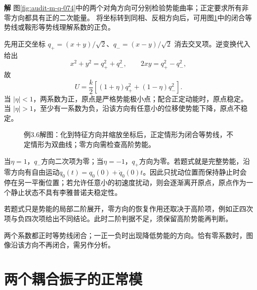 \documentclass[11pt,openany,fontset=fandol]{ctexbook}
\theoremstyle{plain}\newtheorem{theorem}{定理}[chapter]\newtheorem{proposition}[theorem]{命题}
\theoremstyle{definition}\newtheorem{definition}{定义}[chapter]\newtheorem{example}{例}[chapter]
\theoremstyle{remark}\newtheorem*{remark}{说明}
\newcommand{\SolutionStart}{\par\nobreak\medskip\nobreak\noindent\textbf{解}\quad\ignorespaces}
\newenvironment{solution}{\SolutionStart}{\par\medskip}
\begin{document}
\begin{solution}
图\ref{fig:audit-m-q-074}中的两个对角方向可分别检验势能曲率；正定要求所有非零方向都具有正的二次能量。
将坐标转到同相、反相方向后，可用图\ref{fig:eg-3-6}中的闭合等势线或鞍形等势线理解系数的正负。

先用正交坐标 $q_+=(x+y)/\sqrt2$、$q_-=(x-y)/\sqrt2$ 消去交叉项。逆变换代入给出
\[
x^2+y^2=q_+^2+q_-^2,\qquad 2xy=q_+^2-q_-^2,
\]
故
\[
U=\frac k2[(1+\eta)q_+^2+(1-\eta)q_-^2].
\]
当 $|\eta|<1$，两系数为正，原点是严格势能极小点；配合正定动能时，原点稳定。当 $|\eta|>1$，至少有一系数为负，沿该方向有任意小的位移使势能下降，原点不稳定。

\begin{figure}[H]\centering
{}
\caption{例3.6解图：化到特征方向并缩放坐标后，正定情形为闭合等势线，不定情形为双曲线；零方向需检查高阶势能。}
\label{fig:eg-3-6}
\end{figure}

当$\eta=1$，$q_-$方向二次项为零；当$\eta=-1$，$q_+$方向为零。若题式就是完整势能，沿零方向有自由运动$q_0(t)=q_0(0)+\dot q_0(0)t$。因此只扰动位置而保持静止时会停在另一平衡位置；若允许任意小的初速度扰动，则会逐渐离开原点，原点作为一个静止状态不具有李雅普诺夫稳定性。

若题式只是势能的局部二阶展开，零方向的恢复作用还取决于高阶项，例如正四次项与负四次项给出不同结论。此时二阶判据不足，须保留高阶势能再判断。

两个系数都正时等势线闭合；一正一负时出现降低势能的方向。恰有零系数时，图像沿该方向不再闭合，需另作分析。
\end{solution}

\section{两个耦合振子的正常模}
\end{document}

